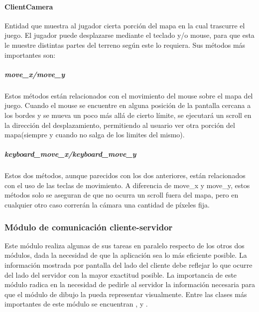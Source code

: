         \paragraph{ClientCamera}
            Entidad que muestra al jugador cierta porción del mapa en la
            cual trascurre el juego. El jugador puede desplazarse mediante el
            teclado y/o mouse, para que esta le muestre distintas partes del
            terreno según este lo requiera. Sus métodos más importantes son:
            \subparagraph{move\_x/move\_y}
                Estos métodos están relacionados con el movimiento del mouse
                sobre el mapa del juego. Cuando el mouse se encuentre en alguna
                posición de la pantalla cercana a los bordes y se mueva un poco
                más allá de cierto límite, se ejecutará un scroll en la
                dirección del desplazamiento, permitiendo al usuario ver otra
                porción del mapa(siempre y cuando no salga de los limites del
                mismo).
            \subparagraph{keyboard\_move\_x/keyboard\_move\_y}
                Estos dos métodos, aunque parecidos con los dos anteriores,
                están relacionados con el uso de las teclas de movimiento. A
                diferencia de move\_x y move\_y, estos métodos solo se aseguran de
                que no ocurra un scroll fuera del mapa, pero en cualquier otro
                caso correrán la cámara una cantidad de píxeles fija.
    \subsubsection{Módulo de comunicación cliente-servidor}
        Este módulo realiza algunas de sus tareas en paralelo respecto de los
        otros dos módulos, dada la necesidad de que la aplicación sea lo más
        eficiente posible. La información mostrada por pantalla del lado del
        cliente debe reflejar lo que ocurre del lado del servidor con la mayor
        exactitud posible. La importancia de este módulo radica en la necesidad
        de pedirle al servidor la información necesaria para que el módulo de
        dibujo la pueda representar visualmente. Entre las clases más
        importantes de este módulo se encuentran ,
         y .
        \def\path{client/Comunicacion.jpg}
        \def\scale{.6}
        \def\text{Communication}
        
